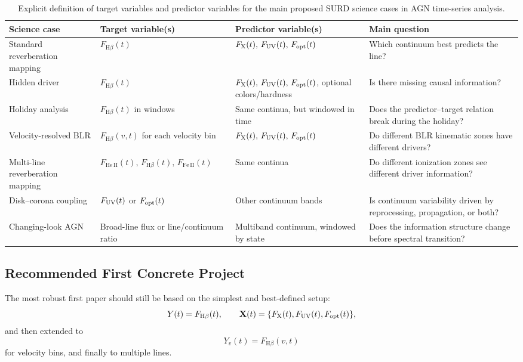 \documentclass{article}
\begin{document}
\begin{table}[htbp]
\centering
\caption{Explicit definition of target variables and predictor variables for the main proposed SURD science cases in AGN time-series analysis.}
\label{tab:surd_targets_predictors}
\begin{tabular}{|p{3.0cm}|p{4.0cm}|p{5.0cm}|p{3.8cm}|}
\hline
\textbf{Science case} & \textbf{Target variable(s)} & \textbf{Predictor variable(s)} & \textbf{Main question} \\
\hline
Standard reverberation mapping & \(F_{\mathrm{H}\beta}(t)\) & \(F_{\rm X}(t),\,F_{\rm UV}(t),\,F_{\rm opt}(t)\) & Which continuum best predicts the line? \\
\hline
Hidden driver & \(F_{\mathrm{H}\beta}(t)\) & \(F_{\rm X}(t),\,F_{\rm UV}(t),\,F_{\rm opt}(t)\), optional colors/hardness & Is there missing causal information? \\
\hline
Holiday analysis & \(F_{\mathrm{H}\beta}(t)\) in windows & Same continua, but windowed in time & Does the predictor--target relation break during the holiday? \\
\hline
Velocity-resolved BLR & \(F_{\mathrm{H}\beta}(v,t)\) for each velocity bin & \(F_{\rm X}(t),\,F_{\rm UV}(t),\,F_{\rm opt}(t)\) & Do different BLR kinematic zones have different drivers? \\
\hline
Multi-line reverberation mapping & \(F_{\mathrm{He\,II}}(t),\,F_{\mathrm{H}\beta}(t),\,F_{\mathrm{Fe\,II}}(t)\) & Same continua & Do different ionization zones see different driver information? \\
\hline
Disk--corona coupling & \(F_{\rm UV}(t)\) or \(F_{\rm opt}(t)\) & Other continuum bands & Is continuum variability driven by reprocessing, propagation, or both? \\
\hline
Changing-look AGN & Broad-line flux or line/continuum ratio & Multiband continuum, windowed by state & Does the information structure change before spectral transition? \\
\hline
\end{tabular}
\end{table}

\subsection{Recommended First Concrete Project}

The most robust first paper should still be based on the simplest and best-defined setup:
\[
Y(t)=F_{\mathrm{H}\beta}(t), \qquad
\mathbf{X}(t)=\{F_{\rm X}(t),F_{\rm UV}(t),F_{\rm opt}(t)\},
\]
and then extended to
\[
Y_v(t)=F_{\mathrm{H}\beta}(v,t)
\]
for velocity bins, and finally to multiple lines.
\end{document}
